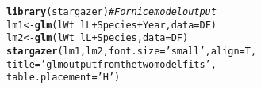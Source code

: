 \documentclass[12pt]{article}\usepackage[]{graphicx}\usepackage[]{color}
\makeatletter
\newcommand{\hlstr}[1]{\textcolor[rgb]{0.192,0.494,0.8}{#1}}%
\newcommand{\hlcom}[1]{\textcolor[rgb]{0.678,0.584,0.686}{\textit{#1}}}%
\newcommand{\hlopt}[1]{\textcolor[rgb]{0,0,0}{#1}}%
\newcommand{\hlstd}[1]{\textcolor[rgb]{0.345,0.345,0.345}{#1}}%
\newcommand{\hlkwb}[1]{\textcolor[rgb]{0.69,0.353,0.396}{#1}}%
\newcommand{\hlkwc}[1]{\textcolor[rgb]{0.333,0.667,0.333}{#1}}%
\newcommand{\hlkwd}[1]{\textcolor[rgb]{0.737,0.353,0.396}{\textbf{#1}}}%
\newenvironment{kframe}{%
 \def\at@end@of@kframe{}%
 \ifinner\ifhmode%
  \def\at@end@of@kframe{\end{minipage}}%
  \begin{minipage}{\columnwidth}%
 \fi\fi%
 \def\FrameCommand##1{\hskip\@totalleftmargin \hskip-\fboxsep
 \colorbox{shadecolor}{##1}\hskip-\fboxsep
     \hskip-\linewidth \hskip-\@totalleftmargin \hskip\columnwidth}%
 \MakeFramed {\advance\hsize-\width
   \@totalleftmargin\z@ \linewidth\hsize
   \@setminipage}}%
 {\par\unskip\endMakeFramed%
 \at@end@of@kframe}
\makeatother
\begin{document}
\begin{kframe}
\begin{alltt}
\hlkwd{library}\hlstd{(stargazer)} \hlcom{# For nice model output}
\hlstd{lm1} \hlkwb{<-} \hlkwd{glm}\hlstd{(lWt} \hlopt{~} \hlstd{lL} \hlopt{+} \hlstd{Species} \hlopt{+} \hlstd{Year,} \hlkwc{data} \hlstd{= DF)}
\hlstd{lm2} \hlkwb{<-} \hlkwd{glm}\hlstd{(lWt} \hlopt{~} \hlstd{lL} \hlopt{+} \hlstd{Species,} \hlkwc{data} \hlstd{= DF)}
\hlkwd{stargazer}\hlstd{(lm1, lm2,} \hlkwc{font.size}  \hlstd{=} \hlstr{'small'}\hlstd{,} \hlkwc{align} \hlstd{= T,}
          \hlkwc{title} \hlstd{=} \hlstr{'glm output from the two model fits'}\hlstd{,}
          \hlkwc{table.placement} \hlstd{=} \hlstr{'H'}\hlstd{)}
\end{alltt}
\end{kframe}
\end{document}

